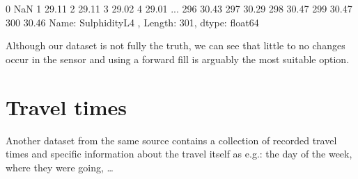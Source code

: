 \documentclass[letterpaper,10pt,english]{jupyterBook}
\begin{document}
\begin{sphinxVerbatim}[commandchars=\\\{\}]
0        NaN
1      29.11
2      29.11
3      29.02
4      29.01
       ...  
296    30.43
297    30.29
298    30.47
299    30.47
300    30.46
Name: SulphidityL\PYGZhy{}4 , Length: 301, dtype: float64
\end{sphinxVerbatim}

\sphinxAtStartPar
Although our dataset is not fully the truth, we can see that little to no changes occur in the sensor and using a forward fill is arguably the most suitable option.


\section{Travel times}
\label{\detokenize{c2_data_preparation/missing_data:travel-times}}
\sphinxAtStartPar
Another dataset from the same source contains a collection of recorded travel times and specific information about the travel itself as e.g.: the day of the week, where they were going, …

\begin{sphinxVerbatim}[commandchars=\\\{\}]
  
\end{sphinxVerbatim}
\end{document}

